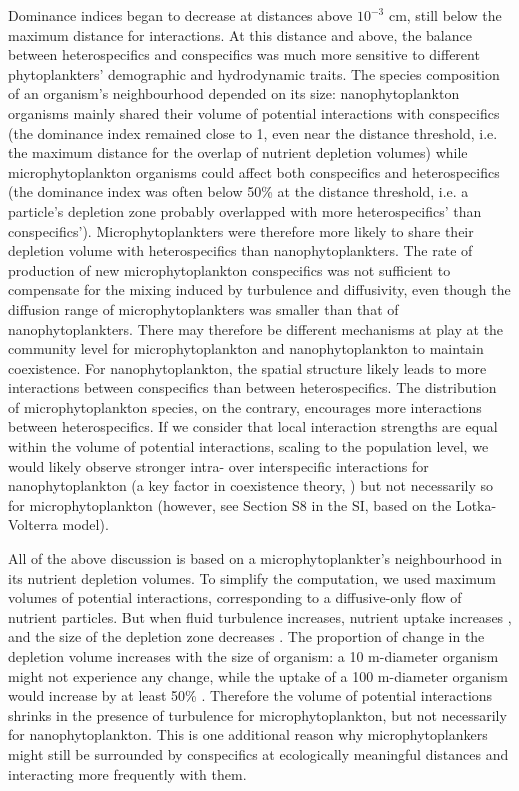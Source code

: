 \documentclass[english]{article}
\begin{document}
Dominance indices began to decrease at distances above $10^{-3}$
cm, still below the maximum distance for interactions. At this distance
and above, the balance between heterospecifics and conspecifics was
much more sensitive to different phytoplankters' demographic and hydrodynamic
traits. The species composition of an organism's neighbourhood depended
on its size: nanophytoplankton organisms mainly shared their volume
of potential interactions with conspecifics (the dominance index remained
close to 1, even near the distance threshold, i.e. the maximum distance
for the overlap of nutrient depletion volumes) while microphytoplankton
organisms could affect both conspecifics and heterospecifics (the
dominance index was often below 50\% at the distance threshold, i.e.
a particle's depletion zone probably overlapped with more heterospecifics'
than conspecifics'). Microphytoplankters were therefore more likely
to share their depletion volume with heterospecifics than nanophytoplankters.
The rate of production of new microphytoplankton conspecifics was
not sufficient to compensate for the mixing induced by turbulence
and diffusivity, even though the diffusion range of microphytoplankters
was smaller than that of nanophytoplankters. There may therefore be
different mechanisms at play at the community level for microphytoplankton
and nanophytoplankton to maintain coexistence. For nanophytoplankton,
the spatial structure likely leads to more interactions between conspecifics
than between heterospecifics. The distribution of microphytoplankton
species, on the contrary, encourages more interactions between heterospecifics.
If we consider that local interaction strengths are equal within the
volume of potential interactions, scaling to the population level,
we would likely observe stronger intra- over interspecific interactions
for nanophytoplankton (a key factor in coexistence theory, \citealp{barabas_self-regulation_2017})
but not necessarily so for microphytoplankton (however, see Section
S8 in the SI, based on the Lotka-Volterra model).

All of the above discussion is based on a microphytoplankter's neighbourhood
in its nutrient depletion volumes. To simplify the computation, we
used maximum volumes of potential interactions, corresponding to a
diffusive-only flow of nutrient particles. But when fluid turbulence
increases, nutrient uptake increases , and the size of the depletion
zone decreases \citep{karp-boss_nutrient_1996}. The proportion of
change in the depletion volume increases with the size of organism:
a 10 \textmu m-diameter organism might not experience any change,
while the uptake of a 100 \textmu m-diameter organism would increase
by at least 50\% \citep{karp-boss_nutrient_1996}. Therefore the volume
of potential interactions shrinks in the presence of turbulence for
microphytoplankton, but not necessarily for nanophytoplankton. This
is one additional reason why microphytoplankers might still be surrounded
by conspecifics at ecologically meaningful distances and interacting
more frequently with them.
\end{document}
